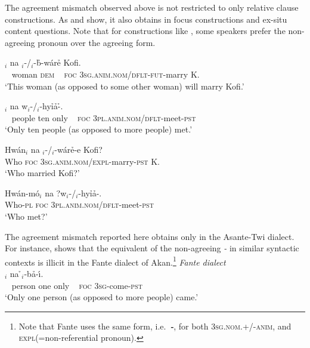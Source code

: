 \documentclass[output=paper]{LSP/langsci}
\begin{document}
\z
\z



The agreement mismatch observed above is not restricted to only relative clause constructions. As  and  show, it also obtains in focus constructions and  ex-situ content questions. Note that for constructions like , some speakers prefer the non-agreeing pronoun over the agreeing form. 
 

        

\ea\label{ex:korsah:18} 
\ea\label{ex:korsah:18a}
$_i$ na  \oor$_i$-/\eer$_i$-b\h \eer-w{\'{a}}r\h e Kofi.\\
 ~ woman \textsc{dem} ~ \textsc{foc} \textsc{3sg.anim.nom}/\textsc{dflt}-\textsc{fut}-marry K. \\
\glt  `This woman (as opposed to some other woman) will marry Kofi.'

\ex\label{ex:korsah:18b}
$_i$ na  w\oor$_i$-/\eer$_i$-hy\h i\h a-\h \eer.\\
 ~ people ten only ~ \textsc{foc} \textsc{3pl.anim.nom}/\textsc{dflt}-meet-\textsc{pst} \\
\glt  `Only ten people (as opposed to more people) met.'

\z
\z


\ea\label{ex:korsah:19} 
\ea\label{ex:korsah:19a}
\gll Hw{\'{a}}n$_i$ na  \oor$_i$-/\eer$_i$-w{\'{a}}r\h e-e Kofi?\\
Who \textsc{foc} \textsc{3sg.anim.nom}/\textsc{expl}-marry-\textsc{pst} K. \\
\glt  `Who married Kofi?'

\ex\label{ex:korsah:19b}
\gll Hw{\'{a}}n-m{\'{o}}$_i$ na ?w\oor$_i$-/\eer$_i$-hy\h i\h a-\eer.\\
Who-\textsc{pl} \textsc{foc} \textsc{3pl.anim.nom}/\textsc{dflt}-meet-\textsc{pst} \\
\glt  `Who met?'

\z
\z

The agreement mismatch reported here obtains only in the Asante-Twi dialect.
For instance,  shows that the equivalent of the non-agreeing \textit{\eer-} in similar syntactic contexts  is illicit in the Fante dialect of Akan.\footnote{Note that Fante uses the same  form, i.e.\ \textit{\textbf{\oor-}}, for both \textsc{3sg.nom.+/-anim}, and \textsc{expl}(=non-referential pronoun).} 
\ea\label{ex:korsah:20}  \textit{Fante dialect} \\
\ea\label{ex:korsah:20a}
\gll [ Ny{\'{i}}p{\'{a}} k{\'{o}}r p{\'{\eer}} ]$_i$ na  \h \oor$_i$-b\h a-{\'{\i}}.\\
 ~ person one only ~ \textsc{foc} \textsc{3sg}-come-\textsc{pst}\\
\glt  `Only one person (as opposed to more people) came.'
\end{document}
